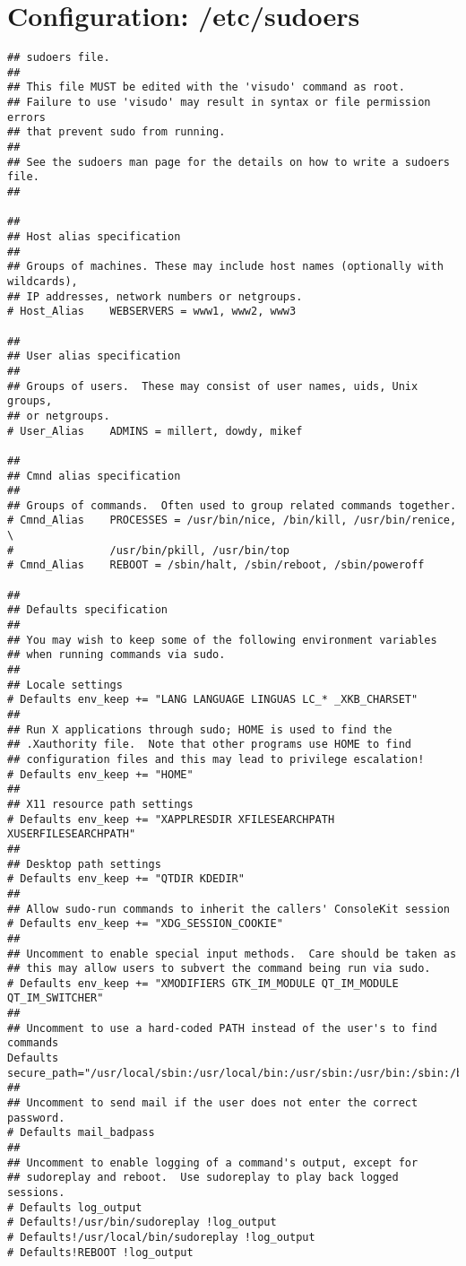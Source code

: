 \section{Configuration: /etc/sudoers}
\label{section:appendix-sudoers}
\begin{verbatim}
## sudoers file.
##
## This file MUST be edited with the 'visudo' command as root.
## Failure to use 'visudo' may result in syntax or file permission errors
## that prevent sudo from running.
##
## See the sudoers man page for the details on how to write a sudoers file.
##

##
## Host alias specification
##
## Groups of machines. These may include host names (optionally with wildcards),
## IP addresses, network numbers or netgroups.
# Host_Alias	WEBSERVERS = www1, www2, www3

##
## User alias specification
##
## Groups of users.  These may consist of user names, uids, Unix groups,
## or netgroups.
# User_Alias	ADMINS = millert, dowdy, mikef

##
## Cmnd alias specification
##
## Groups of commands.  Often used to group related commands together.
# Cmnd_Alias	PROCESSES = /usr/bin/nice, /bin/kill, /usr/bin/renice, \
# 			    /usr/bin/pkill, /usr/bin/top
# Cmnd_Alias	REBOOT = /sbin/halt, /sbin/reboot, /sbin/poweroff

##
## Defaults specification
##
## You may wish to keep some of the following environment variables
## when running commands via sudo.
##
## Locale settings
# Defaults env_keep += "LANG LANGUAGE LINGUAS LC_* _XKB_CHARSET"
##
## Run X applications through sudo; HOME is used to find the
## .Xauthority file.  Note that other programs use HOME to find
## configuration files and this may lead to privilege escalation!
# Defaults env_keep += "HOME"
##
## X11 resource path settings
# Defaults env_keep += "XAPPLRESDIR XFILESEARCHPATH XUSERFILESEARCHPATH"
##
## Desktop path settings
# Defaults env_keep += "QTDIR KDEDIR"
##
## Allow sudo-run commands to inherit the callers' ConsoleKit session
# Defaults env_keep += "XDG_SESSION_COOKIE"
##
## Uncomment to enable special input methods.  Care should be taken as
## this may allow users to subvert the command being run via sudo.
# Defaults env_keep += "XMODIFIERS GTK_IM_MODULE QT_IM_MODULE QT_IM_SWITCHER"
##
## Uncomment to use a hard-coded PATH instead of the user's to find commands
Defaults secure_path="/usr/local/sbin:/usr/local/bin:/usr/sbin:/usr/bin:/sbin:/bin"
##
## Uncomment to send mail if the user does not enter the correct password.
# Defaults mail_badpass
##
## Uncomment to enable logging of a command's output, except for
## sudoreplay and reboot.  Use sudoreplay to play back logged sessions.
# Defaults log_output
# Defaults!/usr/bin/sudoreplay !log_output
# Defaults!/usr/local/bin/sudoreplay !log_output
# Defaults!REBOOT !log_output


\end{verbatim}
